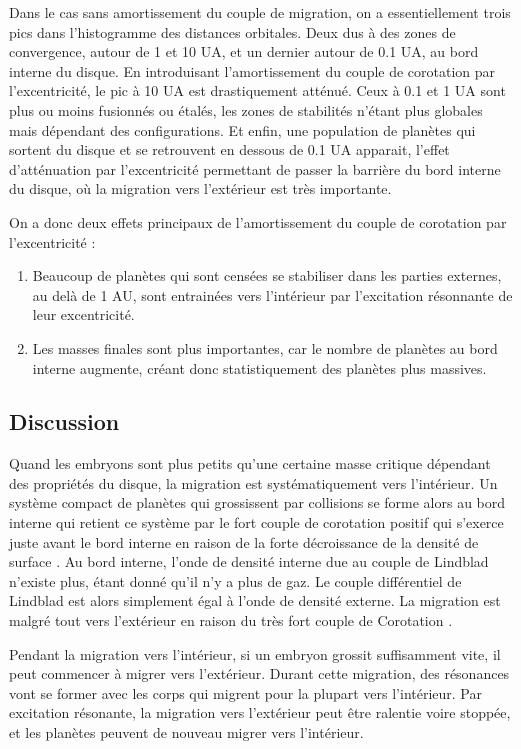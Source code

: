 Dans le cas sans amortissement du couple de migration, on a essentiellement trois pics dans l'histogramme des distances orbitales. Deux dus à des zones de convergence, autour de 1 et 10 UA, et un dernier autour de 0.1 UA, au bord interne du disque. En introduisant l'amortissement du couple de corotation par l'excentricité, le pic à 10 UA est drastiquement atténué. Ceux à 0.1 et 1 UA sont plus ou moins fusionnés ou étalés, les zones de stabilités n'étant plus globales mais dépendant des configurations. Et enfin, une population de planètes qui sortent du disque et se retrouvent en dessous de 0.1 UA apparait, l'effet d'atténuation par l'excentricité permettant de passer la barrière du bord interne du disque, où la migration vers l'extérieur est très importante.

On a donc deux effets principaux de l'amortissement du couple de corotation par l'excentricité : 
\begin{enumerate}
\item Beaucoup de planètes qui sont censées se stabiliser dans les parties externes, au delà de 1 AU, sont entrainées vers l'intérieur par l'excitation résonnante de leur excentricité. 
\item Les masses finales sont plus importantes, car le nombre de planètes au bord interne augmente, créant donc statistiquement des planètes plus massives. 
\end{enumerate}

\subsection{Discussion}
Quand les embryons sont plus petits qu'une certaine masse critique dépendant des propriétés du disque, la migration est systématiquement vers l'intérieur. Un système compact de planètes qui grossissent par collisions se forme alors au bord interne qui retient ce système par le fort couple de corotation positif qui s'exerce juste avant le bord interne en raison de la forte décroissance de la densité de surface \citep{masset2006disk}. Au bord interne, l'onde de densité interne due au couple de Lindblad n'existe plus, étant donné qu'il n'y a plus de gaz. Le couple différentiel de Lindblad est alors simplement égal à l'onde de densité externe. La migration est malgré tout vers l'extérieur en raison du très fort couple de Corotation \citep{masset2006disk}.

Pendant la migration vers l'intérieur, si un embryon grossit suffisamment vite, il peut commencer à migrer vers l'extérieur. Durant cette migration, des résonances vont se former avec les corps qui migrent pour la plupart vers l'intérieur. Par excitation résonante, la migration vers l'extérieur peut être ralentie voire stoppée, et les planètes peuvent de nouveau migrer vers l'intérieur. 

